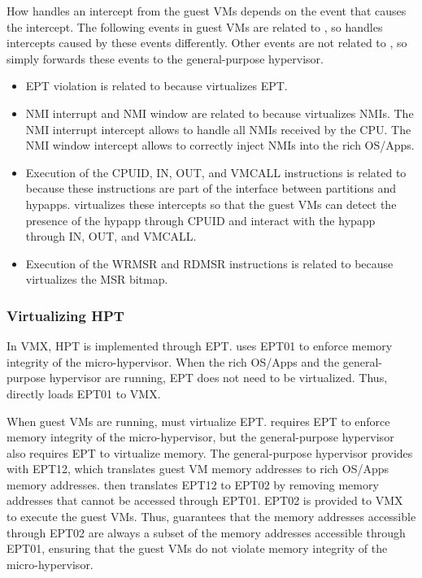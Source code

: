 How  handles an intercept from the guest VMs depends on the event that causes the intercept. The following events in guest VMs are related to , so  handles intercepts caused by these events differently. Other events are not related to , so  simply forwards these events to the general-purpose hypervisor.

\begin{itemize}
\item EPT violation is related to  because  virtualizes EPT.

\item NMI interrupt and NMI window are related to  because  virtualizes NMIs. The NMI interrupt intercept allows  to handle all NMIs received by the CPU. The NMI window intercept allows  to correctly inject NMIs into the rich OS/Apps.

\item Execution of the CPUID, IN, OUT, and VMCALL instructions is related to  because these instructions are part of the interface between  partitions and hypapps.  virtualizes these intercepts so that the guest VMs can detect the presence of the hypapp through CPUID and interact with the hypapp through IN, OUT, and VMCALL.

\item Execution of the WRMSR and RDMSR instructions is related to  because  virtualizes the MSR bitmap.
\end{itemize}

\subsubsection{Virtualizing HPT}

In VMX, HPT is implemented through EPT.  uses EPT01 to enforce memory integrity of the micro-hypervisor. When the rich OS/Apps and the general-purpose hypervisor are running, EPT does not need to be virtualized. Thus,  directly loads EPT01 to VMX.

When guest VMs are running,  must virtualize EPT.  requires EPT to enforce memory integrity of the micro-hypervisor, but the general-purpose hypervisor also requires EPT to virtualize memory. The general-purpose hypervisor provides  with EPT12, which translates guest VM memory addresses to rich OS/Apps memory addresses.  then translates EPT12 to EPT02 by removing memory addresses that cannot be accessed through EPT01. EPT02 is provided to VMX to execute the guest VMs. Thus,  guarantees that the memory addresses accessible through EPT02 are always a subset of the memory addresses accessible through EPT01, ensuring that the guest VMs do not violate memory integrity of the micro-hypervisor.

